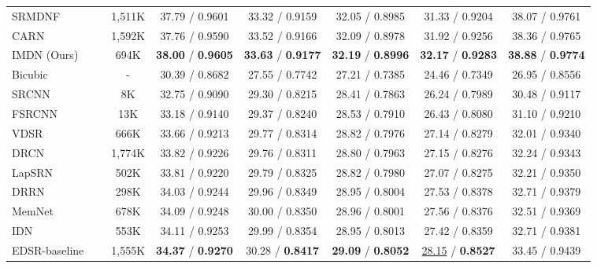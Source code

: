 \documentclass[sigconf]{acmart}
\begin{document}
\begin{table*}[htpb]
\begin{tabular}{|l|c|c|c|c|c|c|c|}
		SRMDNF~\cite{SRMDNF} &  & 1,511K & 37.79 / 0.9601 & 33.32 / 0.9159 & 32.05 / 0.8985 & 31.33 / 0.9204 & 38.07 / 0.9761 \\
		
		CARN~\cite{CARN} &  & 1,592K & 37.76 / 0.9590 & 33.52 / 0.9166 & 32.09 / 0.8978 & 31.92 / 0.9256 & 38.36 / 0.9765 \\
		
		IMDN (Ours) &  & 694K & \textbf{38.00} / \textbf{0.9605} & \textbf{33.63} / \textbf{0.9177} & \textbf{32.19} / \textbf{0.8996} & \textbf{32.17} / \textbf{0.9283} & \textbf{38.88} / \textbf{0.9774} \\
		\hline
		\hline
Bicubic & \multirow{13}{*}{} & - & 30.39 / 0.8682 & 27.55 / 0.7742 & 27.21 / 0.7385 & 24.46 / 0.7349 & 26.95 / 0.8556 \\
		
		SRCNN~\cite{SRCNN} &  & 8K & 32.75 / 0.9090 & 29.30 / 0.8215 & 28.41 / 0.7863 & 26.24 / 0.7989 & 30.48 / 0.9117\\
		
		FSRCNN~\cite{FSRCNN} &  & 13K & 33.18 / 0.9140 & 29.37 / 0.8240 & 28.53 / 0.7910 & 26.43 / 0.8080 & 31.10 / 0.9210 \\
		
		VDSR~\cite{VDSR} &  & 666K & 33.66 / 0.9213 & 29.77 / 0.8314 & 28.82 / 0.7976 & 27.14 / 0.8279 & 32.01 / 0.9340 \\
		
		DRCN~\cite{DRCN} &  & 1,774K & 33.82 / 0.9226 & 29.76 / 0.8311 & 28.80 / 0.7963 & 27.15 / 0.8276 & 32.24 / 0.9343 \\
		
		LapSRN~\cite{LapSRN} &  & 502K & 33.81 / 0.9220 & 29.79 / 0.8325 & 28.82 / 0.7980 & 27.07 / 0.8275 & 32.21 / 0.9350 \\
		
		DRRN~\cite{DRRN} &  & 298K & 34.03 / 0.9244 & 29.96 / 0.8349 & 28.95 / 0.8004 & 27.53 / 0.8378 & 32.71 / 0.9379 \\
		
		MemNet~\cite{MemNet} &  & 678K & 34.09 / 0.9248 & 30.00 / 0.8350 & 28.96 / 0.8001 & 27.56 / 0.8376 & 32.51 / 0.9369\\
		
		IDN~\cite{IDN} &  & 553K & 34.11 / 0.9253 & 29.99 / 0.8354 & 28.95 / 0.8013 & 27.42 / 0.8359 & 32.71 / 0.9381 \\
		
		EDSR-baseline~\cite{EDSR} &  & 1,555K & \textbf{34.37} / \textbf{0.9270} & 30.28 / \textbf{0.8417} & \textbf{29.09} / \textbf{0.8052} & \underline{28.15} / \textbf{0.8527} & 33.45 / 0.9439 \\
		

\end{tabular}
\end{table*}
\end{document}
